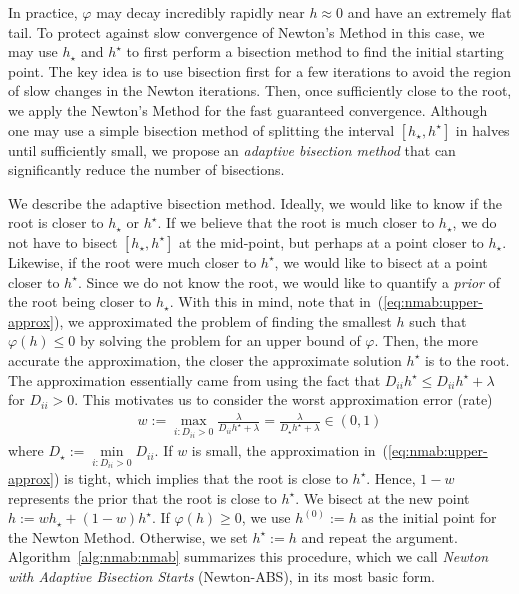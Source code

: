 \documentclass[fontsize=11pt]{article}
\newcommand{\todojames}[1]{\todo[linecolor=blue, backgroundcolor=blue!25, bordercolor=blue]{James: #1}}
\begin{document}
In practice, $\varphi$ may decay incredibly rapidly near $h \approx 0$ and have an extremely flat tail.
To protect against slow convergence of Newton's Method in this case,
we may use $h_\star$ and $h^\star$ to first perform a bisection method to find the initial starting point.
The key idea is to use bisection first for a few iterations 
to avoid the region of slow changes in the Newton iterations.\todojames{refer to a figure?}
Then, once sufficiently close to the root, we apply the Newton's Method for the fast guaranteed convergence.
Although one may use a simple bisection method of splitting the interval $[h_\star, h^\star]$ in halves
until sufficiently small, we propose an \emph{adaptive bisection method} 
that can significantly reduce the number of bisections.

We describe the adaptive bisection method.
Ideally, we would like to know if the root is closer to $h_\star$ or $h^\star$.
If we believe that the root is much closer to $h_\star$,
we do not have to bisect $[h_\star, h^\star]$ at the mid-point, 
but perhaps at a point closer to $h_\star$.
Likewise, if the root were much closer to $h^\star$, 
we would like to bisect at a point closer to $h^\star$.
Since we do not know the root, we would like to quantify a \emph{prior} of 
the root being closer to $h_\star$.
With this in mind, note that in~(\ref{eq:nmab:upper-approx}), we 
approximated the problem of finding the smallest $h$ such that $\varphi(h) \leq 0$
by solving the problem for an upper bound of $\varphi$.
Then, the more accurate the approximation, the closer the approximate solution $h^\star$ is to the root.
The approximation essentially came from using the fact that $D_{ii} h^\star \leq D_{ii} h^\star + \lambda$
for $D_{ii} > 0$.
This motivates us to consider the worst approximation error (rate)
\begin{align*}
    w
    := 
    \max\limits_{i: D_{ii} > 0} \frac{\lambda}{D_{ii} h^\star + \lambda}
    =
    \frac{\lambda}{D_\star h^\star + \lambda}
    \in 
    (0,1)
\end{align*}
where $D_\star := \min\limits_{i : D_{ii} > 0} D_{ii}$.
If $w$ is small, the approximation in~(\ref{eq:nmab:upper-approx}) is tight,
which implies that the root is close to $h^\star$.
Hence, $1-w$ represents the prior that the root is close to $h^\star$.
We bisect at the new point $h := wh_\star + (1-w)h^\star$.
If $\varphi(h) \geq 0$, we use $h^{(0)} := h$ as the initial point for the Newton Method.
Otherwise, we set $h^\star := h$ and repeat the argument.
Algorithm~\ref{alg:nmab:nmab} summarizes this procedure,
which we call \emph{Newton with Adaptive Bisection Starts} (Newton-ABS), 
in its most basic form.
\end{document}
